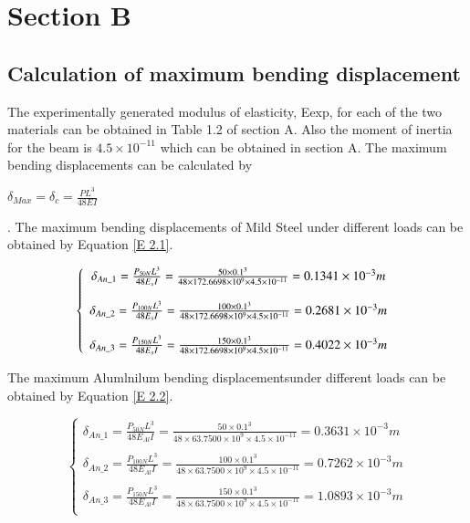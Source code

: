 \section{Section B}
\label{sec:results}

\subsection{Calculation of maximum bending displacement}
The experimentally generated modulus of elasticity, Eexp, for each of the two materials can be obtained in Table 1.2 of section A. Also the moment of inertia for the beam is $4.5\times 10^{-11}$ which can be obtained in section A.
The maximum bending displacements can be calculated by \begin{large}
$\delta _{Max}=\delta _c=\frac{PL^3}{48EI}$\end{large}. 
\newpage 
The maximum bending displacements of Mild Steel under different loads can be obtained by Equation \ref{E 2.1}.
\begin{Large}
\begin{equation}
	\label{E 2.1}
\left\{ \begin{array}{c}
	\delta _{An\_1}=\frac{P_{50N}L^3}{48E_sI}=\frac{50\times 0.1^3}{48\times 172.6698\times 10^9\times 4.5\times 10^{-11}}=0.1341\times 10^{-3}m\\
	\\
	\delta _{An\_2}=\frac{P_{100N}L^3}{48E_sI}=\frac{100\times 0.1^3}{48\times 172.6698\times 10^9\times 4.5\times 10^{-11}}=0.2681\times 10^{-3}m\\
	\\
	\delta _{An\_3}=\frac{P_{150N}L^3}{48E_sI}=\frac{150\times 0.1^3}{48\times 172.6698\times 10^9\times 4.5\times 10^{-11}}=0.4022\times 10^{-3}m\\
\end{array} \right. 
\\
\end{equation}
\end{Large}
\vspace{-8pt}
The maximum Alumlnilum bending displacementsunder different loads can be obtained by Equation \ref{E 2.2}.
\begin{Large}
\begin{equation}
	\label{E 2.2}
\left\{ \begin{array}{c}
	\delta _{An\_1}=\frac{P_{50N}L^3}{48E_{Al}I}=\frac{50\times 0.1^3}{48\times 63.7500\times 10^9\times 4.5\times 10^{-11}}=0.3631\times 10^{-3}m\\
	\\
	\delta _{An\_2}=\frac{P_{100N}L^3}{48E_{Al}I}=\frac{100\times 0.1^3}{48\times 63.7500\times 10^9\times 4.5\times 10^{-11}}=0.7262\times 10^{-3}m\\
	\\
	\delta _{An\_3}=\frac{P_{150N}L^3}{48E_{Al}I}=\frac{150\times 0.1^3}{48\times 63.7500\times 10^9\times 4.5\times 10^{-11}}=1.0893\times 10^{-3}m\\
\end{array} \right. 
\end{equation}
\end{Large}
\vspace{-10pt}
